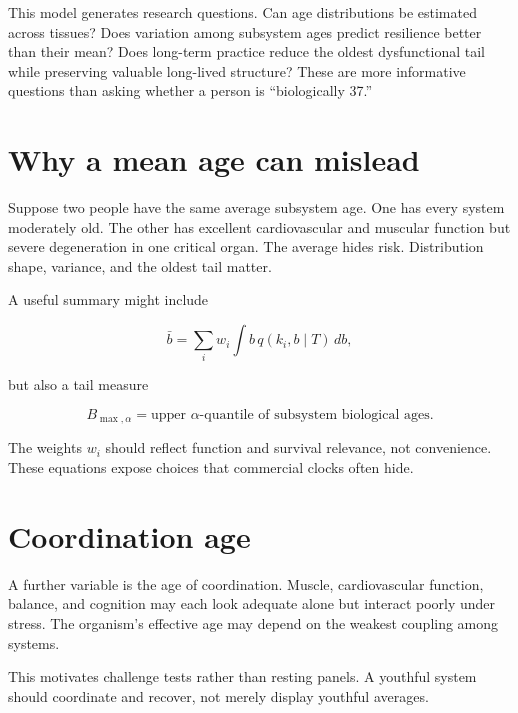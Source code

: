 This model generates research questions. Can age distributions be estimated across tissues? Does variation among subsystem ages predict resilience better than their mean? Does long-term practice reduce the oldest dysfunctional tail while preserving valuable long-lived structure? These are more informative questions than asking whether a person is ``biologically 37.''

\section{Why a mean age can mislead}\label{why-a-mean-age-can-mislead}

Suppose two people have the same average subsystem age. One has every system moderately old. The other has excellent cardiovascular and muscular function but severe degeneration in one critical organ. The average hides risk. Distribution shape, variance, and the oldest tail matter.

A useful summary might include

\[
\bar b=\sum_i w_i\int b\,q(k_i,b\mid T)\,db,
\]

but also a tail measure

\[
B_{\max,\alpha}=\text{upper }\alpha\text{-quantile of subsystem biological ages}.
\]

The weights \(w_i\) should reflect function and survival relevance, not convenience. These equations expose choices that commercial clocks often hide.

\section{Coordination age}\label{coordination-age}

A further variable is the age of coordination. Muscle, cardiovascular function, balance, and cognition may each look adequate alone but interact poorly under stress. The organism's effective age may depend on the weakest coupling among systems.

This motivates challenge tests rather than resting panels. A youthful system should coordinate and recover, not merely display youthful averages.
